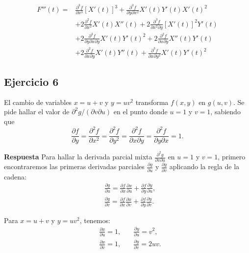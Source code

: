 \documentclass{report}
\begin{document}
    \begin{align*}
    F'''(t) = & \frac{\partial^3 f}{\partial x^3} \left[ X'(t) \right]^3 + \frac{\partial^3 f}{\partial y \partial x^2} X'(t) Y'(t) X'(t)^2 \\
    & + 2 \frac{\partial^2 f}{\partial x^2} X'(t) X''(t) + 2 \frac{\partial^3 f}{\partial x^2 \partial y} \left[ X'(t) \right]^2 Y'(t) \\
    & + 2 \frac{\partial^3 f}{\partial y \partial x \partial y} X'(t) Y'(t)^2 + 2 \frac{\partial^2 f}{\partial x \partial y} X''(t) Y'(t) \\
    & + 2 \frac{\partial^2 f}{\partial x \partial y} X'(t) Y''(t) + \frac{\partial^3 f}{\partial x \partial y^2} X'(t) Y'(t)^2
    \end{align*}\subsection*{Ejercicio 6}
    El cambio de variables \( x = u + v \) y \( y = u v^2 \) transforma \( f(x, y) \) en \( g(u, v) \). Se pide hallar el valor de \(\partial^{2} g / (\partial v \partial u)\) en el punto donde \( u = 1 \) y \( v = 1 \), sabiendo que
    $$
    \frac{\partial f}{\partial y} = \frac{\partial^{2} f}{\partial x^{2}} = \frac{\partial^{2} f}{\partial y^{2}} = \frac{\partial^{2} f}{\partial x \partial y} = \frac{\partial^{2} f}{\partial y \partial x} = 1.
    $$

    \textbf{Respuesta}
    Para hallar la derivada parcial mixta \(\frac{\partial^2 g}{\partial v \partial u}\) en \( u = 1 \) y \( v = 1 \), primero encontraremos las primeras derivadas parciales \(\frac{\partial g}{\partial u}\) y \(\frac{\partial g}{\partial v}\) aplicando la regla de la cadena:
    $$
    \begin{aligned}
    & \frac{\partial g}{\partial u} = \frac{\partial f}{\partial x} \frac{\partial x}{\partial u} + \frac{\partial f}{\partial y} \frac{\partial y}{\partial u}, \\
    & \frac{\partial g}{\partial v} = \frac{\partial f}{\partial x} \frac{\partial x}{\partial v} + \frac{\partial f}{\partial y} \frac{\partial y}{\partial v}.
    \end{aligned}
    $$

    Para \( x = u + v \) y \( y = u v^2 \), tenemos:
    $$
    \begin{aligned}
    & \frac{\partial x}{\partial u} = 1, & \quad \frac{\partial y}{\partial u} = v^2, \\
    & \frac{\partial x}{\partial v} = 1, & \quad \frac{\partial y}{\partial v} = 2 u v.
    \end{aligned}
    $$
\end{document}

